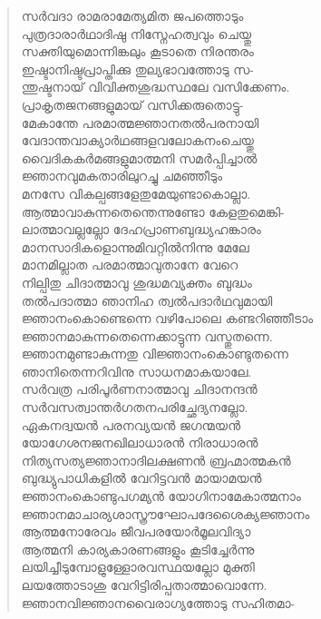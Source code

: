 \begin{verse}
സര്‍വദാ രാമരാമേത്യമിത ജപത്തൊടും\\
പുത്രദാരാര്‍ഥാദിഷു നിസ്നേഹത്വവും ചെയ്തു\\
സക്തിയുമൊന്നിങ്കലും കൂടാതെ നിരന്തരം\\
ഇഷ്ടാനിഷ്ടപ്രാപ്തിക്കു തുല്യഭാവത്തോടു സ-\\
ന്തുഷ്ടനായ് വിവിക്തശുദ്ധസ്ഥലേ വസിക്കേണം.\\
പ്രാകൃതജനങ്ങളുമായ് വസിക്കരുതൊട്ടു-\\
മേകാന്തേ പരമാത്മജ്ഞാനതല്‍പരനായി\\
വേദാന്തവാക്യാര്‍ഥങ്ങളവലോകനംചെയ്തു\\
വൈദികകര്‍മങ്ങളുമാത്മനി സമര്‍പ്പിച്ചാല്‍\\
ജ്ഞാനവുമകതാരിലുറച്ചു ചമഞ്ഞീടും\\
മനസേ വികല്പങ്ങളേതുമേയുണ്ടാകൊല്ലാ.\\
ആത്മാവാകുന്നതെന്തെന്നുണ്ടോ കേളതുമെങ്കി-\\
ലാത്മാവല്ലല്ലോ ദേഹപ്രാണബുദ്ധ്യഹങ്കാരം\\
മാനസാദികളൊന്നുമിവറ്റില്‍നിന്നു മേലേ\\
മാനമില്ലാത പരമാത്മാവുതാനേ വേറെ\\
നില്പിതു ചിദാത്മാവു ശുദ്ധമവ്യക്തം ബുദ്ധം\\
തല്‍പദാത്മാ ഞാനിഹ ത്വല്‍പദാര്‍ഥവുമായി\\
ജ്ഞാനംകൊണ്ടെന്നെ വഴിപോലെ കണ്ടറിഞ്ഞീടാം\\
ജ്ഞാനമാകുന്നതെന്നെക്കാട്ടുന്ന വസ്തുതന്നെ.\\
ജ്ഞാനമുണ്ടാകുന്നതു വിജ്ഞാനംകൊണ്ടുതന്നെ\\
ഞാനിതെന്നറിവിനു സാധനമാകയാലേ.\\
സര്‍വത്ര പരിപൂര്‍ണനാത്മാവു ചിദാനന്ദന്‍\\
സര്‍വസത്വാന്തര്‍ഗതനപരിച്ഛേദ്യനല്ലോ.\\
ഏകനദ്വയന്‍ പരനവ്യയന്‍ ജഗന്മയന്‍\\
യോഗേശനജനഖിലാധാരന്‍ നിരാധാരന്‍\\
നിത്യസത്യജ്ഞാനാദിലക്ഷണന്‍ ബ്രഹ്മാത്മകന്‍\\
ബുദ്ധ്യുപാധികളില്‍ വേറിട്ടവന്‍ മായാമയന്‍\\
ജ്ഞാനംകൊണ്ടുപഗമ്യന്‍ യോഗിനാമേകാത്മനാം\\
ജ്ഞാനമാചാര്യശാസ്ത്രൗഘോപദേശൈക്യജ്ഞാനം\\
ആത്മനോരേവം ജീവപരയോര്‍മൂലവിദ്യാ\\
ആത്മനി കാര്യകാരണങ്ങളും കൂടിച്ചേര്‍ന്നു\\
ലയിച്ചീടുമ്പോളുള്ളോരവസ്ഥയല്ലോ മുക്തി\\
ലയത്തോടാശു വേറിട്ടിരിപ്പതാത്മാവൊന്നേ.\\
ജ്ഞാനവിജ്ഞാനവൈരാഗ്യത്തോടു സഹിതമാ-\\

\end{verse}
